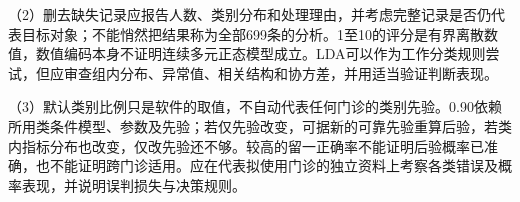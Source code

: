 （2）删去缺失记录应报告人数、类别分布和处理理由，并考虑完整记录是否仍代表目标对象；不能悄然把结果称为全部699条的分析。1至10的评分是有界离散数值，数值编码本身不证明连续多元正态模型成立。LDA可以作为工作分类规则尝试，但应审查组内分布、异常值、相关结构和协方差，并用适当验证判断表现。

（3）默认类别比例只是软件的取值，不自动代表任何门诊的类别先验。0.90依赖所用类条件模型、参数及先验；若仅先验改变，可据新的可靠先验重算后验，若类内指标分布也改变，仅改先验还不够。较高的留一正确率不能证明后验概率已准确，也不能证明跨门诊适用。应在代表拟使用门诊的独立资料上考察各类错误及概率表现，并说明误判损失与决策规则。
\par\nobreak\smallskip{}
